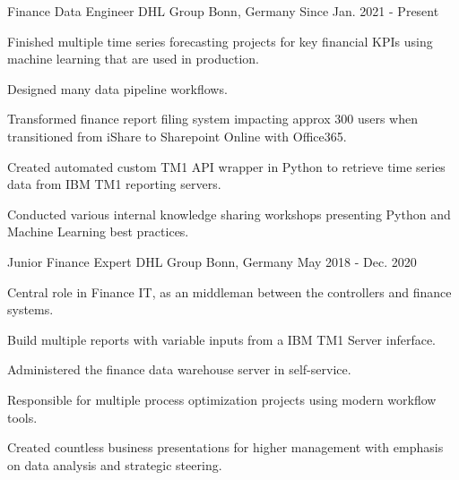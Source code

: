 

\begin{cventries}
\cventry
  {Finance Data Engineer} %
  {DHL Group} %
  {Bonn, Germany} %
  {Since Jan. 2021 - Present} %
  {
    \begin{cvitems} %
      \item {Finished multiple time series forecasting projects for key financial KPIs using machine learning that are used in production.}
      \item {Designed many data pipeline workflows.}
      \item {Transformed finance report filing system impacting approx 300 users when transitioned from iShare to Sharepoint Online with Office365.}
      \item {Created automated custom TM1 API wrapper in Python to retrieve time series data from IBM TM1 reporting servers.}
      \item {Conducted various internal knowledge sharing workshops presenting Python and Machine Learning best practices.}
    \end{cvitems}
  }


\cventry
  {Junior Finance Expert} %
  {DHL Group} %
  {Bonn, Germany} %
  {May 2018 - Dec. 2020} %
  {
    \begin{cvitems} %
      \item {Central role in Finance IT, as an middleman between the controllers and finance systems.}
      \item {Build multiple reports with variable inputs from a IBM TM1 Server inferface.}
      \item {Administered the finance data warehouse server in self-service.}
      \item {Responsible for multiple process optimization projects using modern workflow tools.}
      \item {Created countless business presentations for higher management with emphasis on data analysis and strategic steering.}
    \end{cvitems}
  }


\end{cventries}
